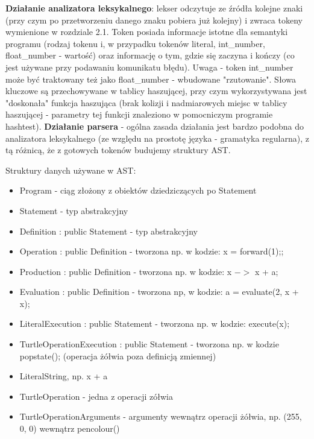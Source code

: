 \documentclass{article}
\begin{document}
\textbf{Działanie analizatora leksykalnego}: lekser odczytuje ze źródła kolejne znaki (przy czym po przetworzeniu danego znaku pobiera już kolejny) i zwraca tokeny wymienione w rozdziale 2.1. Token posiada informacje istotne dla semantyki programu (rodzaj tokenu i, w przypadku tokenów literal, int\_number, float\_number - wartość) oraz informację o tym, gdzie się zaczyna i kończy (co jest używane przy podawaniu komunikatu błędu). Uwaga - token int\_number może być traktowany też jako float\_number - wbudowane "rzutowanie". Słowa kluczowe są przechowywane w tablicy haszującej, przy czym wykorzystywana jest "doskonała" funkcja haszująca (brak kolizji i nadmiarowych miejsc w tablicy haszującej - parametry tej funkcji znaleziono w pomocniczym programie hashtest).\newline{}\newline{}
\textbf{Działanie parsera} - ogólna zasada działania jest bardzo podobna do analizatora leksykalnego (ze względu na prostotę języka - gramatyka regularna), z tą różnicą, że z gotowych tokenów budujemy struktury AST. \newline{}

Struktury danych używane w AST:
\begin{itemize}
    \item{Program - ciąg złożony z obiektów dziedziczących po Statement}
    \item{Statement - typ abstrakcyjny}
    \item{Definition : public Statement - typ abstrakcyjny}
    \item{Operation : public Definition - tworzona np. w kodzie: x = { forward(1);}; }
    \item{Production : public Definition - tworzona np. w kodzie: x $->$ x + a;}
    \item{Evaluation : public Definition - tworzona np, w kodzie: a = evaluate(2, x + x);}
    \item{LiteralExecution : public Statement - tworzona np. w kodzie: execute(x);}
    \item{TurtleOperationExecution : public Statement - tworzona np. w kodzie popstate(); (operacja żółwia poza definicją zmiennej)}
    \item{LiteralString, np. x + a}
    \item{TurtleOperation - jedna z operacji zółwia}
    \item{TurtleOperationArguments - argumenty wewnątrz operacji żółwia, np. (255, 0, 0) wewnątrz pencolour()}
\end{itemize}
\end{document}
